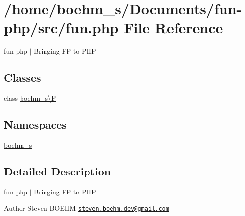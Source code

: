 \hypertarget{fun_8php}{}\section{/home/boehm\+\_\+s/\+Documents/fun-\/php/src/fun.php File Reference}
\label{fun_8php}


fun-\/php $\vert$ Bringing FP to P\+HP  


\subsection*{Classes}
\begin{DoxyCompactItemize}
\item 
class \hyperlink{classboehm__s_1_1F}{boehm\+\_\+s\textbackslash{}F}
\end{DoxyCompactItemize}
\subsection*{Namespaces}
\begin{DoxyCompactItemize}
\item 
 \hyperlink{namespaceboehm__s}{boehm\+\_\+s}
\end{DoxyCompactItemize}


\subsection{Detailed Description}
fun-\/php $\vert$ Bringing FP to P\+HP 

\begin{DoxyAuthor}{Author}
Steven B\+O\+E\+HM \href{mailto:steven.boehm.dev@gmail.com}{\tt steven.\+boehm.\+dev@gmail.\+com} 
\end{DoxyAuthor}
